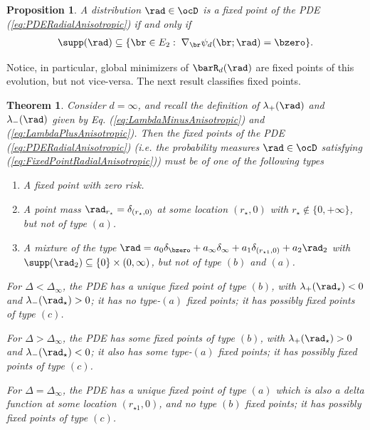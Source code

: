 \documentclass[11pt]{article}
\newtheorem{theorem}{Theorem}
\newtheorem{proposition}{Proposition}
\begin{document}
\begin{proposition}\label{propo:FixedPointdRadialAnisotropic}
A distribution $\rad\in \ocD$ is a fixed point of the PDE (\ref{eq:PDERadialAnisotropic}) if and only if 
%
\begin{align}
\supp(\rad) \subseteq \{\br \in E_2: \;\nabla_\br \psi_d(\br ; \rad) = \bzero \}.\label{eq:FixedPointRadialAnisotropic}
\end{align}
\end{proposition}

Notice, in particular, global minimizers of $\barR_d(\rad)$ are fixed points of this evolution, but not vice-versa. The next result classifies fixed points.


\begin{theorem}\label{thm:local_minimizer_infinite_d_anisotropic}
Consider $d = \infty$, and recall the definition of $\lambda_+(\rad)$ and $\lambda_-(\rad)$ given by Eq. (\ref{eq:LambdaMinusAnisotropic}) and (\ref{eq:LambdaPlusAnisotropic}). Then the  fixed points of the PDE (\ref{eq:PDERadialAnisotropic}) (i.e. the probability measures $\rad\in\ocD$ satisfying (\ref{eq:FixedPointRadialAnisotropic})) must
be of one of the following types 
\begin{enumerate}
\item[$(a)$] A fixed point with zero risk. 
\item[$(b)$] A point mass $\rad_{r_\star} = \delta_{(r_\star, 0)}$ at some location $(r_\star, 0)$ with $r_\star \not \in\{ 0, +\infty\}$, but not of type $(a)$.
\item[$(c)$] A mixture of the type $\rad = a_0 \delta_\bzero + a_\infty \delta_{\infty} + a_1 \delta_{(r_{\star 1}, 0)} + a_2 \rad_2$ with $\supp(\rad_2) \subseteq \{0 \} \times (0, \infty)$, but not of type $(b)$ and $(a)$. 
\end{enumerate}

For  $\Delta < \Delta_\infty$, the PDE has a unique fixed point of type $(b)$, with $\lambda_+(\rad_\star) < 0$ and $\lambda_-(\rad_\star) > 0$; it has no type-$(a)$ fixed points;
it has possibly  fixed points  of type $(c)$.

For $\Delta > \Delta_\infty$, the PDE has some fixed points of type $(b)$, with $\lambda_+(\rad_\star) > 0$ and $\lambda_-(\rad_\star) < 0$; it also has some type-$(a)$ fixed points;
it has possibly  fixed points  of type $(c)$.

For $\Delta = \Delta_\infty$, the PDE has a unique fixed point of type $(a)$ which is also a delta function at some location $(r_{\star1}, 0)$, and no type $(b)$ fixed points;
it has possibly  fixed points  of type $(c)$.

\end{theorem}
\end{document}
